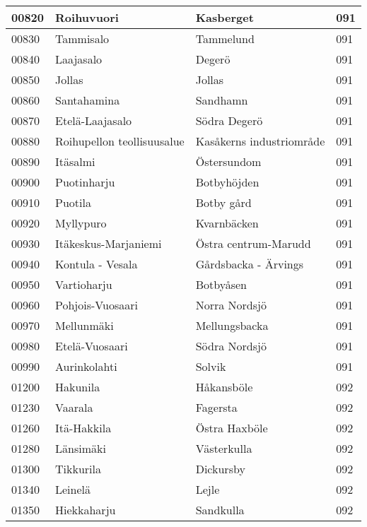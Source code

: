 \begin{center}
\begin{longtable}{|l l l l|}
        00820 & Roihuvuori & Kasberget & 091 \\ [0.25ex] \hline
        00830 & Tammisalo & Tammelund & 091 \\ [0.25ex] \hline
        00840 & Laajasalo & Degerö & 091 \\ [0.25ex] \hline
        00850 & Jollas & Jollas & 091 \\ [0.25ex] \hline
        00860 & Santahamina & Sandhamn & 091 \\ [0.25ex] \hline
        00870 & Etelä-Laajasalo & Södra Degerö & 091 \\ [0.25ex] \hline
        00880 & Roihupellon teollisuusalue & Kasåkerns industriområde & 091 \\ [0.25ex] \hline
        00890 & Itäsalmi & Östersundom & 091 \\ [0.25ex] \hline
        00900 & Puotinharju & Botbyhöjden & 091 \\ [0.25ex] \hline
        00910 & Puotila & Botby gård & 091 \\ [0.25ex] \hline
        00920 & Myllypuro & Kvarnbäcken & 091 \\ [0.25ex] \hline
        00930 & Itäkeskus-Marjaniemi & Östra centrum-Marudd & 091 \\ [0.25ex] \hline
        00940 & Kontula - Vesala & Gårdsbacka - Ärvings & 091 \\ [0.25ex] \hline
        00950 & Vartioharju & Botbyåsen & 091 \\ [0.25ex] \hline
        00960 & Pohjois-Vuosaari & Norra  Nordsjö & 091 \\ [0.25ex] \hline
        00970 & Mellunmäki & Mellungsbacka & 091 \\ [0.25ex] \hline
        00980 & Etelä-Vuosaari & Södra Nordsjö & 091 \\ [0.25ex] \hline
        00990 & Aurinkolahti & Solvik & 091 \\ [0.25ex] \hline
        01200 & Hakunila & Håkansböle & 092 \\ [0.25ex] \hline
        01230 & Vaarala & Fagersta & 092 \\ [0.25ex] \hline
        01260 & Itä-Hakkila & Östra Haxböle & 092 \\ [0.25ex] \hline
        01280 & Länsimäki & Västerkulla & 092 \\ [0.25ex] \hline
        01300 & Tikkurila & Dickursby & 092 \\ [0.25ex] \hline
        01340 & Leinelä & Lejle & 092 \\ [0.25ex] \hline
        01350 & Hiekkaharju & Sandkulla & 092 \\ [0.25ex] \hline

\end{longtable}
\end{center}
